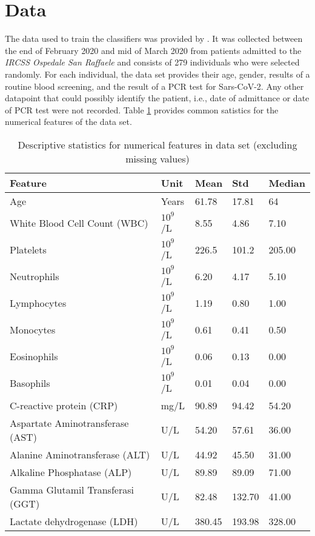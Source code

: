\section{Data}
The data used to train the classifiers was provided by \citeauthor{RN127} \cite{RN127}. 
It was collected between the end of February 2020 and mid of March 2020 from patients admitted to the \textit{IRCSS Ospedale San Raffaele} and consists of 279 individuals who were selected randomly.
For each individual, the data set provides their age, gender, results of a 
routine blood screening, and the result of a PCR test for Sars-CoV-2.
Any other datapoint that could possibly identify the patient, i.e., date of 
admittance or date of PCR test were not recorded. Table \ref{tab:feature-dist} 
provides common satistics for the numerical features of the data set.
\begin{center}
\begin{table}[h]
\begin{tabular}{lllll}
Feature                          & Unit                    & Mean   & Std    & 
Median \\ \hline
Age                              & Years                   & 61.78  & 17.81  & 
64     \\
White Blood Cell Count (WBC)     & $10^9$/L & 8.55   & 4.86   & 
7.10   \\
Platelets                        & $10^9$/L & 226.5  & 101.2  & 
205.00 \\
Neutrophils                      & $10^9$/L & 6.20   & 4.17   & 
5.10   \\
Lymphocytes                      & $10^9$/L & 1.19   & 0.80   & 
1.00   \\
Monocytes                        & $10^9$/L & 0.61   & 0.41   & 
0.50   \\
Eosinophils                      & $10^9$/L & 0.06   & 0.13   & 
0.00   \\
Basophils                        & $10^9$/L & 0.01   & 0.04   & 
0.00   \\
C-reactive protein (CRP)         & mg/L                    & 90.89  & 94.42  & 
54.20  \\
Aspartate Aminotransferase (AST) & U/L                     & 54.20  & 57.61  & 
36.00  \\
Alanine Aminotransferase (ALT)   & U/L                     & 44.92  & 45.50  & 
31.00  \\
Alkaline Phosphatase (ALP)       & U/L                     & 89.89  & 89.09  & 
71.00  \\
Gamma Glutamil Transferasi (GGT) & U/L                     & 82.48  & 132.70 & 
41.00  \\
Lactate dehydrogenase (LDH)      & U/L                     & 380.45 & 193.98 & 
328.00
\end{tabular}
\caption{Descriptive statistics for numerical features in data set (excluding 
missing values)}
\label{tab:feature-dist}
\end{table}
\end{center}
